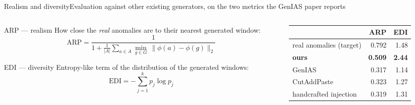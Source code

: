 \documentclass[aspectratio=169,9pt,xcolor=table]{beamer}
\newcommand{\gd}[1]{\textcolor{good}{\textbf{#1}}}
\newcommand{\mt}[1]{\textcolor{mute}{#1}}
\newcommand{\tablestripe}{\rowcolors{2}{band}{white}}
\begin{document}
\begin{frame}{Realism and diversity}{Evaluation against other existing generators, on the
  two metrics the GenIAS paper reports}

  \begin{columns}[T]
    \begin{column}{0.53\textwidth}
      \begin{eqbox}{ARP --- realism}
        \footnotesize
        How close the \emph{real} anomalies are to their nearest generated window:
        \vspace{-0.4em}
        \[
          \mathrm{ARP} = \frac{1}{1 + \frac{1}{|A|}\sum_{a \in A}
            \min_{g \in G}\,\lVert \phi(a) - \phi(g)\rVert_2}
        \]
        \vspace{-1.5em}
      \end{eqbox}

      \vspace{0.06cm}
      \begin{eqbox}[good]{EDI --- diversity}
        \footnotesize
       Entropy-like term of the distribution of the generated windows:
        \vspace{-0.4em}
        \[
          \mathrm{EDI} = -\sum_{j=1}^{k} p_j \log p_j
        \]
        \vspace{-1.5em}
      \end{eqbox}

      \vspace{0.06cm}
      {}
    \end{column}

    \begin{column}{0.44\textwidth}
      \centering
      \tablestripe
      \small\renewcommand{\arraystretch}{1.5}
      \begin{tabular}{@{}l r r@{}}
        \toprule
          & ARP & EDI \\
        \midrule
        real anomalies \mt{(target)}               & 0.792 & 1.48 \\
        \textbf{ours}                              & \gd{0.509} & \gd{2.44} \\
        GenIAS                                     & 0.317 & 1.14 \\
        CutAddPaste                                & 0.323 & 1.27 \\
        handcrafted injection                      & 0.319 & 1.31 \\
        \bottomrule
      \end{tabular}

      \vspace{0.25cm}
      \raggedright
      {}
    \end{column}
  \end{columns}
\end{frame}
\end{document}
